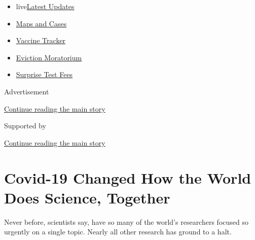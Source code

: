 \begin{itemize}
\tightlist
\item
  live\href{https://www.nytimes3xbfgragh.onion/2020/09/09/world/covid-19-coronavirus.html?name=styln-coronavirus-national\&region=TOP_BANNER\&block=storyline_menu_recirc\&action=click\&pgtype=Article\&impression_id=931ed3f0-f2cd-11ea-bbb3-1fcabe959d46\&variant=undefined}{Latest
  Updates}
\item
  \href{https://www.nytimes3xbfgragh.onion/interactive/2020/us/coronavirus-us-cases.html?name=styln-coronavirus-national\&region=TOP_BANNER\&block=storyline_menu_recirc\&action=click\&pgtype=Article\&impression_id=931ed3f1-f2cd-11ea-bbb3-1fcabe959d46\&variant=undefined}{Maps
  and Cases}
\item
  \href{https://www.nytimes3xbfgragh.onion/interactive/2020/science/coronavirus-vaccine-tracker.html?name=styln-coronavirus-national\&region=TOP_BANNER\&block=storyline_menu_recirc\&action=click\&pgtype=Article\&impression_id=931ed3f2-f2cd-11ea-bbb3-1fcabe959d46\&variant=undefined}{Vaccine
  Tracker}
\item
  \href{https://www.nytimes3xbfgragh.onion/2020/09/02/your-money/eviction-moratorium-covid.html?name=styln-coronavirus-national\&region=TOP_BANNER\&block=storyline_menu_recirc\&action=click\&pgtype=Article\&impression_id=931ed3f3-f2cd-11ea-bbb3-1fcabe959d46\&variant=undefined}{Eviction
  Moratorium}
\item
  \href{https://www.nytimes3xbfgragh.onion/2020/09/09/upshot/coronavirus-surprise-test-fees.html?name=styln-coronavirus-national\&region=TOP_BANNER\&block=storyline_menu_recirc\&action=click\&pgtype=Article\&impression_id=931ed3f4-f2cd-11ea-bbb3-1fcabe959d46\&variant=undefined}{Surprise
  Test Fees}
\end{itemize}

Advertisement

\protect\hyperlink{after-top}{Continue reading the main story}

Supported by

\protect\hyperlink{after-sponsor}{Continue reading the main story}

\hypertarget{covid-19-changed-how-the-world-does-science-together}{%
\section{Covid-19 Changed How the World Does Science,
Together}\label{covid-19-changed-how-the-world-does-science-together}}

Never before, scientists say, have so many of the world's researchers
focused so urgently on a single topic. Nearly all other research has
ground to a halt.

